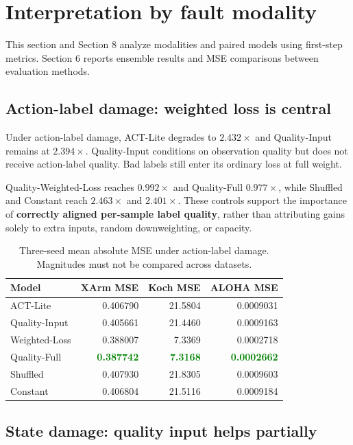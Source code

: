 \documentclass[11pt,a4paper]{article}
\newcommand{\good}[1]{\textcolor{green}{\bfseries #1}}
\begin{document}
\section{Interpretation by fault modality}

This section and Section 8 analyze modalities and paired models using first-step metrics. Section 6 reports ensemble results and MSE comparisons between evaluation methods.

\subsection{Action-label damage: weighted loss is central}

Under action-label damage, ACT-Lite degrades to $2.432\times$ and Quality-Input remains at $2.394\times$. Quality-Input conditions on observation quality but does not receive action-label quality. Bad labels still enter its ordinary loss at full weight.

Quality-Weighted-Loss reaches $0.992\times$ and Quality-Full $0.977\times$, while Shuffled and Constant reach $2.463\times$ and $2.401\times$. These controls support the importance of \textbf{correctly aligned per-sample label quality}, rather than attributing gains solely to extra inputs, random downweighting, or capacity.

\begin{table}[htbp]
\centering
\small
\begin{tabularx}{\linewidth}{Y rrr}
\toprule
Model & XArm MSE & Koch MSE & ALOHA MSE\\
\midrule
ACT-Lite & 0.406790 & 21.5804 & 0.0009031\\
Quality-Input & 0.405661 & 21.4460 & 0.0009163\\
Weighted-Loss & 0.388007 & 7.3369 & 0.0002718\\
Quality-Full & \good{0.387742} & \good{7.3168} & \good{0.0002662}\\
Shuffled & 0.407930 & 21.8305 & 0.0009603\\
Constant & 0.406804 & 21.5116 & 0.0009184\\
\bottomrule
\end{tabularx}
\caption{Three-seed mean absolute MSE under action-label damage. Magnitudes must not be compared across datasets.}
\end{table}

\subsection{State damage: quality input helps partially}
\end{document}
